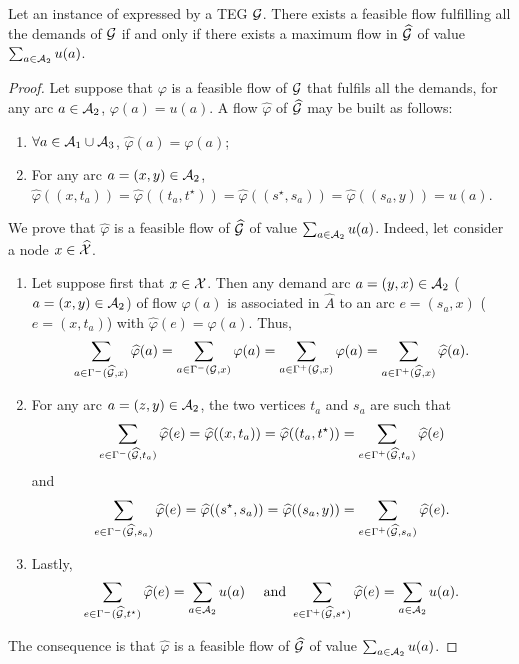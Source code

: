 \begin{theorem}\label{theo:pol}
Let an instance of \emph{\SDPALLDEMANDS} expressed by a TEG $\mathcal{G}$.
There exists a feasible flow fulfilling all the demands of $\mathcal{G}$ if and only if there exists a maximum flow in $\widehat{\mathcal{G}}$ of value $\sum_{a\in \mathcal{A}_2} u(a)$. 
\end{theorem}
\begin{proof}
Let suppose that $\varphi$ is a feasible flow of $\mathcal{G}$ that fulfils all the demands, \ie for any arc $a \in \mathcal{A}_2$, $\varphi(a) = u(a)$.
A flow $\widehat{\varphi}$ of $\widehat{\mathcal{G}}$ may be built as follows:
\begin{enumerate}
\item
$\forall a \in \mathcal{A}_1 \cup \mathcal{A}_3$, 
$\widehat{\varphi}(a) = \varphi(a)$;
\item
For any arc $a=(x,y) \in \mathcal{A}_2$, 
$\widehat{\varphi}((x,t_a))=\widehat{\varphi}((t_a,t^\star))=\widehat{\varphi}((s^\star, s_a))=\widehat{\varphi}((s_a,y))=u(a)$.
\end{enumerate}
We prove that $\widehat{\varphi}$ is a feasible flow of $\widehat{\mathcal{G}}$ of value $\sum_{a \in \mathcal{A}_2} u(a)$. 
Indeed, let consider a node $x \in \widehat{\mathcal{X}}$.
\begin{enumerate}
\item Let suppose first that $x \in \mathcal{X}$.
Then any demand arc ${a = (y,x) \in \mathcal{A}_2}$ (\resp ${a = (x,y) \in \mathcal{A}_2}$) of flow $\varphi(a)$ is associated in $\widehat{A}$ to an
arc $e = (s_a, x)$ (\resp $e = (x, t_a)$) with ${\widehat{\varphi}(e) = \varphi(a)}$.
Thus, 
\[\sum_{a \in \Gamma^-(\widehat{\mathcal{G}}, x)} \widehat{\varphi}(a)=
\sum_{a \in \Gamma^-(\mathcal{G}, x)} \varphi(a)=\sum_{a \in \Gamma^+(\mathcal{G}, x)} \varphi(a)=
\sum_{a \in \Gamma^+(\widehat{\mathcal{G}}, x)} \widehat{\varphi}(a)\text{.}\]

\item
For any arc $a=(z,y)\in \mathcal{A}_2$, the two vertices $t_a$ and $s_a$ are such that
\[\sum_{e \in \Gamma^-(\widehat{\mathcal{G}}, t_a)} \widehat{\varphi}(e)=\widehat{\varphi}((x, t_a))=\widehat{\varphi}((t_a, t^\star))=\sum_{e \in \Gamma^+(\widehat{\mathcal{G}}, t_a)} \widehat{\varphi}(e)\]
and
\[\sum_{e \in \Gamma^-(\widehat{\mathcal{G}}, s_a)} \widehat{\varphi}(e)=\widehat{\varphi}((s^\star,s_a))=\widehat{\varphi}((s_a, y))=\sum_{e \in \Gamma^+(\widehat{\mathcal{G}}, s_a)} \widehat{\varphi}(e)\text{.}\]

\item
Lastly, \[\sum_{e \in \Gamma^-(\widehat{\mathcal{G}}, t^\star)} \widehat{\varphi}(e)=\sum_{a\in \mathcal{A}_2} u(a) \text{ ~~ and } \sum_{e \in \Gamma^+(\widehat{\mathcal{G}}, s^\star)} \widehat{\varphi}(e)=\sum_{a\in \mathcal{A}_2} u(a)\text{.}\]
\end{enumerate}
The consequence is that $\widehat\varphi$ is a feasible flow of $\widehat{\mathcal{G}}$ of value $\sum_{a\in \mathcal{A}_2} u(a)$. 


\end{proof}
